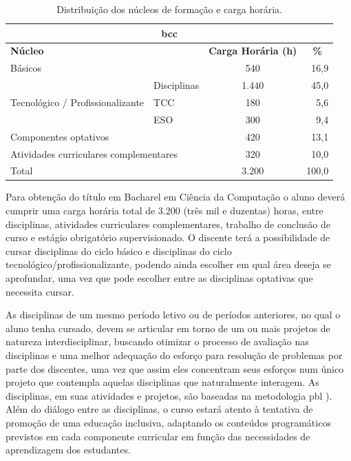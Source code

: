\documentclass[
	12pt,				%
	openright,			%
  oneside,     %
	a4paper,			%
 hyphens,
	chapter=TITLE,		%
	english,			%
	french,				%
	spanish,			%
	brazil				%
	]{abntex2}
\begin{document}
  \begin{center}
    
    \begin{scriptsize}
      \begin{longtable}{p{4cm}p{1.5cm}p{2cm}p{3cm}}
        \caption{\label{quadro:distribuicao-nucleos-formacao-e-ch}Distribuição dos núcleos de formação e carga horária.}\\
      \toprule
      \multicolumn{4}{c}{\textbf{\acrlong{bcc}}}\\ \midrule
      \multicolumn{2}{l}{\textbf{Núcleo}} & \multicolumn{1}{c}{\textbf{Carga Horária (h)}} & \multicolumn{1}{c}{\textbf{\%}}\\
      \midrule
      Básicos & & \multicolumn{1}{c}{540} & \multicolumn{1}{r}{16,9}\\ \midrule
      \multirow{3}{3cm}{Tecnológico / Profissionalizante} & Disciplinas & \multicolumn{1}{c}{1.440} & \multicolumn{1}{r}{45,0}\\ \cline{2-4}
      & TCC & \multicolumn{1}{c}{180} & \multicolumn{1}{r}{5,6}\\ \cline{2-4}
      & ESO & \multicolumn{1}{c}{300} & \multicolumn{1}{r}{9,4}\\ \midrule
      \multicolumn{2}{l}{Componentes optativos} & \multicolumn{1}{c}{420} & \multicolumn{1}{r}{13,1}\\ \midrule
      \multicolumn{2}{l}{Atividades curriculares complementares} & \multicolumn{1}{c}{320} & \multicolumn{1}{r}{10,0}\\ \midrule
      \multicolumn{2}{l}{Total} & \multicolumn{1}{c}{3.200} & \multicolumn{1}{r}{100,0}\\
  \bottomrule
  \end{longtable}
  \end{scriptsize}      
  \end{center}
  
  Para obtenção do título em Bacharel em Ciência da Computação o aluno deverá cumprir uma carga horária total de 3.200 (três mil e duzentas) horas, entre disciplinas, atividades curriculares complementares, trabalho de conclusão de curso e estágio obrigatório supervisionado. O discente terá a possibilidade de cursar disciplinas do ciclo básico e disciplinas do ciclo tecnológico/profissionalizante, podendo ainda escolher em qual área deseja se aprofundar, uma vez que pode escolher entre as disciplinas optativas que necessita cursar.
  
  As disciplinas de um mesmo período letivo ou de períodos anteriores, no qual o aluno tenha cursado, devem se articular em torno de um ou mais projetos de natureza interdisciplinar, buscando otimizar o processo de avaliação nas disciplinas e uma melhor adequação do esforço para resolução de problemas por parte dos discentes, uma vez que assim eles concentram seus esforços num único projeto que contempla aquelas disciplinas que naturalmente interagem. As disciplinas, em suas atividades e projetos, são baseadas na metodologia \acrshort{pbl} \cite{barrows1986taxonomy}). Além do diálogo entre as disciplinas, o curso estará atento à tentativa de promoção de uma educação inclusiva, adaptando os conteúdos programáticos previstos em cada componente curricular em função das necessidades de aprendizagem dos estudantes.
  
\end{document}
